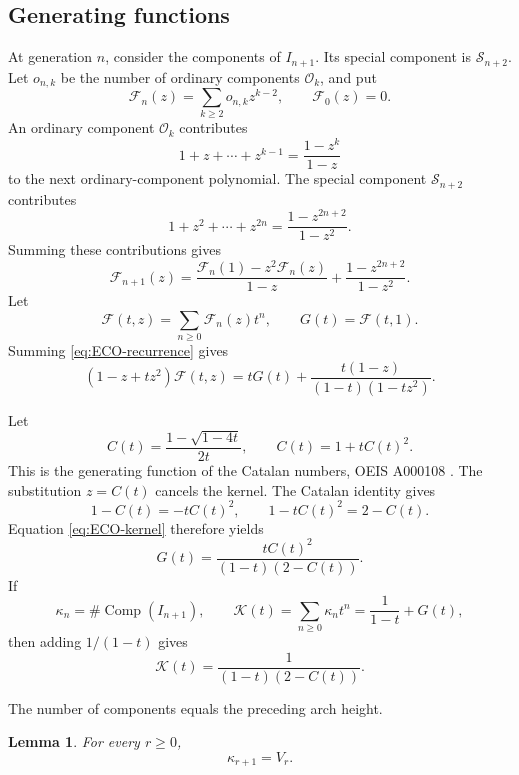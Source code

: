 \documentclass[11pt]{article}
\newtheorem{lemma}[theorem]{Lemma}
\theoremstyle{definition}
\theoremstyle{remark}
\DeclareMathOperator{\Comp}{Comp}
\begin{document}
\subsection{Generating functions}

At generation \(n\), consider the components of \(I_{n+1}\).  Its special
component is \(\mathcal S_{n+2}\).  Let \(o_{n,k}\) be the number of ordinary
components \(\mathcal O_k\), and put
\[
 \mathscr F_n(z)=\sum_{k\geq2}o_{n,k}z^{k-2},
 \qquad \mathscr F_0(z)=0.
\]
An ordinary component \(\mathcal O_k\) contributes
\[
 1+z+\cdots+z^{k-1}=\frac{1-z^k}{1-z}
\]
to the next ordinary-component polynomial.  The special component
\(\mathcal S_{n+2}\) contributes
\[
 1+z^2+\cdots+z^{2n}=\frac{1-z^{2n+2}}{1-z^2}.
\]
Summing these contributions gives
\begin{equation}
\label{eq:ECO-recurrence}
 \mathscr F_{n+1}(z)
 =\frac{\mathscr F_n(1)-z^2\mathscr F_n(z)}{1-z}
 +\frac{1-z^{2n+2}}{1-z^2}.
\end{equation}
Let
\[
 \mathscr F(t,z)=\sum_{n\geq0}\mathscr F_n(z)t^n,
 \qquad G(t)=\mathscr F(t,1).
\]
Summing \eqref{eq:ECO-recurrence} gives
\begin{equation}
\label{eq:ECO-kernel}
 (1-z+tz^2)\mathscr F(t,z)
 =tG(t)+\frac{t(1-z)}{(1-t)(1-tz^2)}.
\end{equation}

Let
\[
 C(t)=\frac{1-\sqrt{1-4t}}{2t},
 \qquad C(t)=1+tC(t)^2.
\]
This is the generating function of the Catalan numbers, OEIS A000108
\cite{OEIS}.
The substitution \(z=C(t)\) cancels the kernel.  The Catalan identity gives
\[
 1-C(t)=-tC(t)^2,
 \qquad
 1-tC(t)^2=2-C(t).
\]
Equation \eqref{eq:ECO-kernel} therefore yields
\[
 G(t)=\frac{tC(t)^2}{(1-t)(2-C(t))}.
\]
If
\[
 \kappa_n=\#\Comp(I_{n+1}),
 \qquad
 \mathscr K(t)=\sum_{n\geq0}\kappa_nt^n=\frac1{1-t}+G(t),
\]
then adding \(1/(1-t)\) gives
\begin{equation*}
 \mathscr K(t)=\frac1{(1-t)(2-C(t))}.
\end{equation*}

The number of components equals the preceding arch height.
\begin{lemma}

For every \(r\geq0\),
\begin{equation}
\label{eq:a-V}
 \kappa_{r+1}=V_r.
\end{equation}
\end{lemma}
\end{document}
